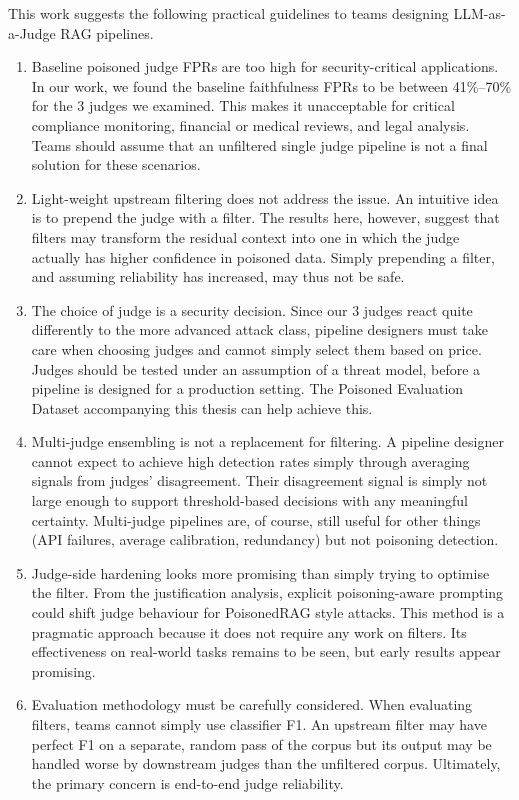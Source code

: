 This work suggests the following practical guidelines to teams designing LLM-as-a-Judge RAG pipelines.
\begin{enumerate}
\item Baseline poisoned judge FPRs are too high for security-critical applications. In our work, we found the baseline faithfulness FPRs to be between 41\%--70\% for the 3 judges we examined. This makes it unacceptable for critical compliance monitoring, financial or medical reviews, and legal analysis. Teams should assume that an unfiltered single judge pipeline is not a final solution for these scenarios.
\item Light-weight upstream filtering does not address the issue. An intuitive idea is to prepend the judge with a filter. The results here, however, suggest that filters may transform the residual context into one in which the judge actually has higher confidence in poisoned data. Simply prepending a filter, and assuming reliability has increased, may thus not be safe.
\item The choice of judge is a security decision. Since our 3 judges react quite differently to the more advanced attack class, pipeline designers must take care when choosing judges and cannot simply select them based on price. Judges should be tested under an assumption of a threat model, before a pipeline is designed for a production setting. The Poisoned Evaluation Dataset accompanying this thesis can help achieve this.
\item Multi-judge ensembling is not a replacement for filtering. A pipeline designer cannot expect to achieve high detection rates simply through averaging signals from judges' disagreement. Their disagreement signal is simply not large enough to support threshold-based decisions with any meaningful certainty. Multi-judge pipelines are, of course, still useful for other things (API failures, average calibration, redundancy) but not poisoning detection.
\item Judge-side hardening looks more promising than simply trying to optimise the filter. From the justification analysis, explicit poisoning-aware prompting could shift judge behaviour for PoisonedRAG style attacks. This method is a pragmatic approach because it does not require any work on filters. Its effectiveness on real-world tasks remains to be seen, but early results appear promising.
\item Evaluation methodology must be carefully considered. When evaluating filters, teams cannot simply use classifier F1. An upstream filter may have perfect F1 on a separate, random pass of the corpus but its output may be handled worse by downstream judges than the unfiltered corpus. Ultimately, the primary concern is end-to-end judge reliability.
\end{enumerate}
